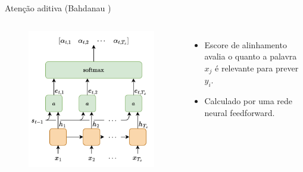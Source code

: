 \documentclass{beamer}
\begin{document}
\begin{frame}{Atenção aditiva (Bahdanau \cite{bahdanau2014neural})}
\begin{columns}[t]
		\vspace{-8mm}
		\begin{figure}[h]
			\centering
			\includegraphics[height=0.55\textheight]{assets/Bahdanau-Alignment.png}
		\end{figure}
		\vspace{-3mm}
		\small
		\begin{itemize}
			\item Escore de alinhamento avalia o quanto a palavra $x_j$ é relevante para prever $y_i$.
			\item Calculado por uma rede neural feedforward.
		\end{itemize}

	\end{columns}

\end{frame}
\end{document}
